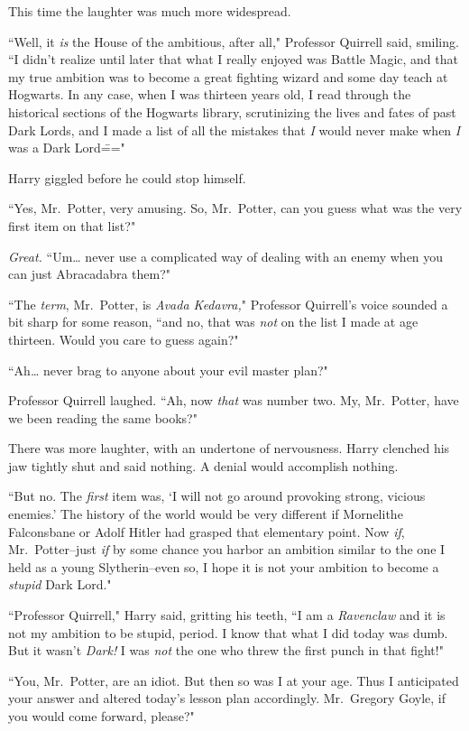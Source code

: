 This time the laughter was much more widespread.

``Well, it \emph{is} the House of the ambitious, after all," Professor Quirrell said, smiling. ``I didn't realize until later that what I really enjoyed was Battle Magic, and that my true ambition was to become a great fighting wizard and some day teach at Hogwarts. In any case, when I was thirteen years old, I read through the historical sections of the Hogwarts library, scrutinizing the lives and fates of past Dark Lords, and I made a list of all the mistakes that \emph{I} would never make when \emph{I} was a Dark Lord\==="

Harry giggled before he could stop himself.

``Yes, Mr.~Potter, very amusing. So, Mr.~Potter, can you guess what was the very first item on that list?"

\emph{Great.} ``Um{\ldots} never use a complicated way of dealing with an enemy when you can just Abracadabra them?"

``The \emph{term}, Mr.~Potter, is \emph{Avada Kedavra,}" Professor Quirrell's voice sounded a bit sharp for some reason, ``and no, that was \emph{not} on the list I made at age thirteen. Would you care to guess again?"

``Ah{\ldots} never brag to anyone about your evil master plan?"

Professor Quirrell laughed. ``Ah, now \emph{that} was number two. My, Mr.~Potter, have we been reading the same books?"

There was more laughter, with an undertone of nervousness. Harry clenched his jaw tightly shut and said nothing. A denial would accomplish nothing.

``But no. The \emph{first} item was, `I will not go around provoking strong, vicious enemies.' The history of the world would be very different if Mornelithe Falconsbane or Adolf Hitler had grasped that elementary point. Now \emph{if}, Mr.~Potter\---just \emph{if} by some chance you harbor an ambition similar to the one I held as a young Slytherin\---even so, I hope it is not your ambition to become a \emph{stupid} Dark Lord."

``Professor Quirrell," Harry said, gritting his teeth, ``I am a \emph{Ravenclaw} and it is not my ambition to be stupid, period. I know that what I did today was dumb. But it wasn't \emph{Dark!} I was \emph{not} the one who threw the first punch in that fight!"

``You, Mr.~Potter, are an idiot. But then so was I at your age. Thus I anticipated your answer and altered today's lesson plan accordingly. Mr.~Gregory Goyle, if you would come forward, please?"

